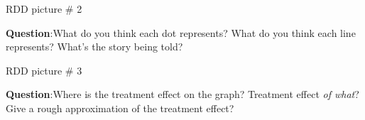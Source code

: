\documentclass{beamer}
\begin{document}
	
	
\begin{frame}{RDD picture \# 2}
	
	\begin{figure}
	\end{figure}

\textbf{Question}:What do you think each dot represents? What do you think each line represents? What's the story being told?
	
	
\end{frame}

\begin{frame}{RDD picture \# 3}
	
	\begin{figure}
	\end{figure}

\textbf{Question}:Where is the treatment effect on the graph? Treatment effect \emph{of what}? Give a rough approximation of the treatment effect?
	
	
\end{frame}
\end{document}
